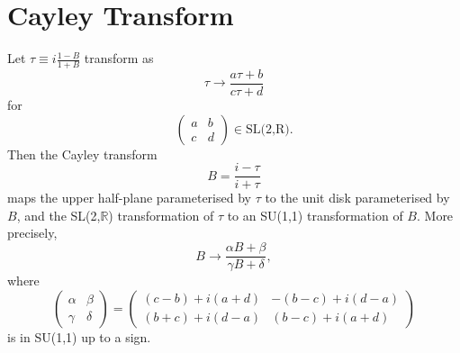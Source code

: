 \section{Cayley Transform}
\label{sec:cayley_transform}
Let $\tau \equiv i \frac{1-B}{1+B}$ transform as 
\begin{equation}
\tau \to \frac{a\tau+b}{c\tau+d}
\end{equation}
for
\begin{equation}
\begin{pmatrix}
a & b \\ c & d
\end{pmatrix}
\in \text{SL(2,R)}.
\end{equation}
Then the Cayley transform
\begin{equation}
B = \frac{i-\tau}{i+\tau}
\end{equation}
maps the upper half-plane parameterised by $\tau$ to the unit disk parameterised by $B$, and the SL(2,$\mathbb{R}$) transformation of $\tau$ to an SU(1,1) transformation of $B$.
More precisely,
\begin{equation}
B \to \frac{\alpha B + \beta}{\gamma B + \delta},
\end{equation}
where
\begin{equation}
\begin{pmatrix}
\alpha & \beta \\ \gamma & \delta
\end{pmatrix}
=
\begin{pmatrix}
(c-b)+i(a+d) & -(b-c)+i(d-a) \\ (b+c)+i(d-a) & (b-c)+i(a+d)
\end{pmatrix}
\end{equation}
is in SU(1,1) up to a sign.